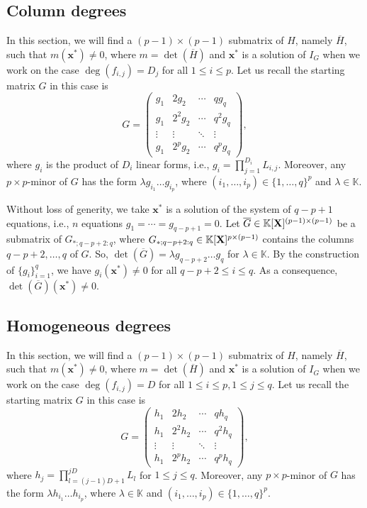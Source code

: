 \documentclass[11pt]{article}
\numberwithin{Property}{section}
\numberwithin{Theorem}{section}
\numberwithin{Proposition}{section}
\numberwithin{Lemma}{section}
\numberwithin{Corollary}{section}
\numberwithin{Definition}{section}
\numberwithin{Remark}{section}
\numberwithin{Conjecture}{section}
\numberwithin{Problem}{section}
\numberwithin{Example}{section}
\numberwithin{Claim}{section}
\renewcommand{\leq}{\leqslant}
\def\bar{\overline}
\newcommand{\field}{\mathbb{K}} %
\newcommand{\mat}[1]{\mathbf{\MakeUppercase{#1}}} %
\begin{document}
\subsection{Column degrees}
\label{subsec:cd2}
In this section, we will find a $(p-1)\times (p-1)$ submatrix of $H$, namely $\bar{H}$, such that $m(\mathbf{x}^*) \ne 0$, where $m = \det(\bar{H})$ and $\mathbf{x}^*$ is a solution of $I_G$ when we work on the case $\deg(f_{i,j}) = D_j$ for all $1 \leq i \leq p$. Let us recall the starting matrix $G$ in this case is 
\[G = 
\left( \begin{matrix}
g_1 & 2g_2 & \cdots & qg_{q}\\
g_1 & 2^2g_2 & \cdots & q^2g_q\\
\vdots & \vdots & \ddots & \vdots \\
g_1 & 2^pg_2 & \cdots & q^pg_q
\end{matrix} \right),
\]
where $g_{i}$ is the product of $D_i$ linear forms, i.e., $g_i = \prod_{j = 1}^{D_i}L_{i,j}$. Moreover, any $p \times p$-minor of $G$ has the form $\lambda g_{i_1}\ldots g_{i_p}$, where $(i_1, \ldots, i_p) \in \{1, \ldots,q\}^{p}$ and $\lambda \in \field$.

Without loss of generity, we take $\mathbf{x}^*$ is a solution of the system of $q-p+1$ equations, i.e., $n$ equations $g_1 = \cdots = g_{q-p+1} = 0$. Let $\bar{G} \in \field[\mat{X}]^{(p-1) \times (p-1)}$ be a submatrix of $G_{*;q-p+2:q}$, where $G_{*;q-p+2:q} \in \field[\mat{X}]^{p \times (p-1)}$ contains the columns $q-p+2, \ldots, q$ of $G$. So, $\det(\bar{G}) = \lambda g_{q-p+2}\ldots g_{q}$ for $\lambda \in \field$. By the construction of $\{g_i\}_{i=1}^{q}$, we have $g_i(\mathbf{x}^*) \ne 0$ for all $q-p+2 \leq i \leq q$. As a consequence, $\det(\bar{G})(\mathbf{x}^*) \ne 0$. 
 
\subsection{Homogeneous degrees}
\label{subsec:hom2}
In this section, we will find a $(p-1)\times (p-1)$ submatrix of $H$, namely $\bar{H}$, such that $m(\mathbf{x}^*) \ne 0$, where $m = \det(\bar{H})$ and $\mathbf{x}^*$ is a solution of $I_G$ when we work on the case $\deg(f_{i,j}) = D$ for all $1 \leq i \leq p, 1\leq j \leq q$. Let us recall the starting matrix $G$ in this case is 
\[G = 
\left( \begin{matrix}
h_1 & 2h_2 & \cdots & qh_q\\
h_1 & 2^2h_2 & \cdots & q^2h_q\\
\vdots &\vdots & \ddots & \vdots \\
h_1 & 2^ph_2 & \cdots & q^ph_q
\end{matrix} \right),
\] where $h_j = \prod_{l=(j-1)D+1}^{jD} L_{l}$ for $1 \leq j \leq q$. Moreover, any $p \times p$-minor of $G$ has the form $\lambda h_{i_1} \ldots h_{i_p}$, where $\lambda \in \field$ and $(i_1, \ldots, i_p) \in \{1, \ldots, q\}^p$. 
\end{document}
